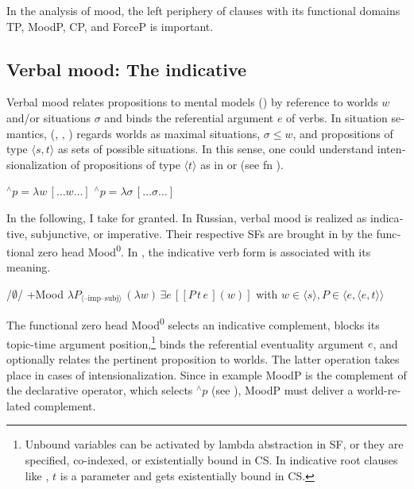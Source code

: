 \documentclass[output=paper,colorlinks,citecolor=brown]{langscibook}
\begin{document}
\begin{otherlanguage}{english}
In the analysis of mood, the left periphery of clauses with its functional domains TP, MoodP, CP, and ForceP is important.

\subsection{Verbal mood: The indicative}

Verbal mood relates propositions to mental models (\citealt{Lohnstein2000}) by reference to worlds $w$ and/or situations $\sigma$ and binds the referential argument $e$ of verbs. In situation semantics, \citeauthor{Kratzer1989} (\citeyear{Kratzer1989}, \citeyear{Kratzer2004}, \citeyear{Kratzer2011}) regards worlds as maximal situations, $\sigma \le w$, and propositions of type $\langle s, t \rangle$ as sets of possible situations. In this sense, one could understand intensionalization of propositions of type $\langle t \rangle$ as in  or  (see fn ).

\begin{exe}
\ex	\label{ex:16:7}
\begin{xlist}
	\ex   $^{\wedge}p=\lambda w \, [\ldots w \ldots]$ \label{wieza1}
    \ex   $^{\wedge}p=\lambda \sigma \, [\ldots \sigma \ldots]$ \label{wieza2}
\end{xlist}
\end{exe}

\noindent In the following, I take  for granted. In Russian, verbal mood is realized as indicative, subjunctive, or imperative. Their respective SFs are brought in by the functional zero head Mood\textsuperscript{0}. In , the indicative verb form is associated with its meaning.

\begin{exe}
\ex	\label{ex:16:8}
\begin{xlist}
	\ex /$\emptyset$/
    \ex +Mood
    \ex $\lambda P_{\langle –\text{imp}–\text{subj} \rangle} \, (\lambda w) \, \exists e \, [[P \, t \, e \,](w)]$ \newline
    with $w \in \langle s \rangle, P \in \langle e, \langle e, t \rangle\rangle $ \label{ex:16:8c}
\end{xlist}
\end{exe}

\noindent The functional zero head Mood\textsuperscript{0} selects an indicative complement, blocks its topic-time argument position,\footnote{Unbound variables can be activated by lambda abstraction in SF, or they are specified, co-indexed, or existentially bound in CS. In indicative root clauses like , $t$ is a parameter and gets existentially bound in CS.
} binds the referential eventuality argument $e$, and optionally relates the pertinent proposition to worlds. The latter operation takes place in cases of intensionalization. Since in example  MoodP is the complement of the declarative operator, which selects {} $^{\wedge}p$ (see ), MoodP must deliver a world-related complement.


\end{otherlanguage}
\end{document}
